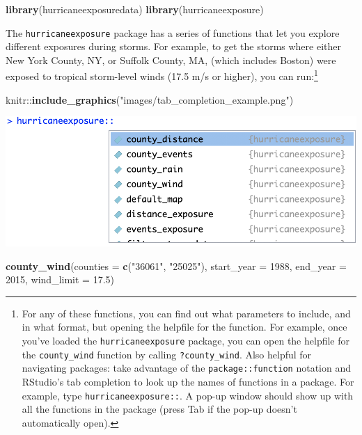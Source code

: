 \documentclass[]{tufte-book}
\newenvironment{Shaded}{}{}
\newcommand{\DataTypeTok}[1]{\textcolor[rgb]{0.56,0.13,0.00}{#1}}
\newcommand{\DecValTok}[1]{\textcolor[rgb]{0.25,0.63,0.44}{#1}}
\newcommand{\FloatTok}[1]{\textcolor[rgb]{0.25,0.63,0.44}{#1}}
\newcommand{\KeywordTok}[1]{\textcolor[rgb]{0.00,0.44,0.13}{\textbf{#1}}}
\newcommand{\NormalTok}[1]{#1}
\newcommand{\OperatorTok}[1]{\textcolor[rgb]{0.40,0.40,0.40}{#1}}
\newcommand{\StringTok}[1]{\textcolor[rgb]{0.25,0.44,0.63}{#1}}
\begin{document}
\begin{Shaded}
\begin{Highlighting}[]
\KeywordTok{library}\NormalTok{(hurricaneexposuredata)}
\KeywordTok{library}\NormalTok{(hurricaneexposure)}
\end{Highlighting}
\end{Shaded}

The \texttt{hurricaneexposure} package has a series of functions that let you explore different
exposures during storms. For example, to get the storms where either New York County, NY,
or Suffolk County, MA, (which includes Boston) were exposed to tropical storm-level winds
(17.5 m/s or higher), you can run:\footnote{For any of these functions, you can find out what parameters
  to include, and in what format, but opening the helpfile for the function. For example, once you've
  loaded the \texttt{hurricaneexposure} package, you can open the helpfile for the \texttt{county\_wind} function
  by calling \texttt{?county\_wind}. Also helpful for navigating packages: take advantage of the \texttt{package::function}
  notation and RStudio's tab completion to look up the names of functions in a package. For example,
  type \texttt{hurricaneexposure::}. A pop-up window should show up with all the functions in the package (press
  Tab if the pop-up doesn't automatically open).}

\begin{Shaded}
\begin{Highlighting}[]
\NormalTok{knitr}\OperatorTok{::}\KeywordTok{include_graphics}\NormalTok{(}\StringTok{"images/tab_completion_example.png"}\NormalTok{)}
\end{Highlighting}
\end{Shaded}

\begin{marginfigure}
\includegraphics[width=13.68in]{images/tab_completion_example} \end{marginfigure}

\begin{Shaded}
\begin{Highlighting}[]
\KeywordTok{county_wind}\NormalTok{(}\DataTypeTok{counties =} \KeywordTok{c}\NormalTok{(}\StringTok{"36061"}\NormalTok{, }\StringTok{"25025"}\NormalTok{), }\DataTypeTok{start_year =} \DecValTok{1988}\NormalTok{, }
    \DataTypeTok{end_year =} \DecValTok{2015}\NormalTok{, }\DataTypeTok{wind_limit =} \FloatTok{17.5}\NormalTok{)}
\end{Highlighting}
\end{Shaded}
\end{document}
